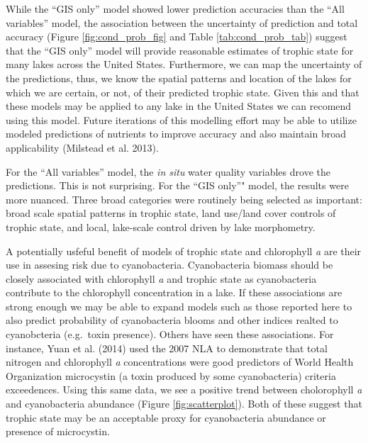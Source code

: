 \documentclass[12pt,]{article}
\begin{document}
While the ``GIS only'' model showed lower prediction accuracies than the
``All variables'' model, the association between the uncertainty of
prediction and total accuracy (Figure \ref{fig:cond_prob_fig} and Table
\ref{tab:cond_prob_tab}) suggest that the ``GIS only'' model will
provide reasonable estimates of trophic state for many lakes across the
United States. Furthermore, we can map the uncertainty of the
predictions, thus, we know the spatial patterns and location of the
lakes for which we are certain, or not, of their predicted trophic
state. Given this and that these models may be applied to any lake in
the United States we can recomend using this model. Future iterations of
this modelling effort may be able to utilize modeled predictions of
nutrients to improve accuracy and also maintain broad applicability
(Milstead et al. 2013).

For the ``All variables'' model, the \emph{in situ} water quality
variables drove the predictions. This is not surprising. For the ``GIS
only''" model, the results were more nuanced. Three broad categories
were routinely being selected as important: broad scale spatial patterns
in trophic state, land use/land cover controls of trophic state, and
local, lake-scale control driven by lake morphometry.

A potentially usfeful benefit of models of trophic state and chlorophyll
\emph{a} are their use in assesing risk due to cyanobacteria.
Cyanobacteria biomass should be closely associated with chlorophyll
\emph{a} and trophic state as cyanobacteria contribute to the
chlorophyll concentration in a lake. If these associations are strong
enough we may be able to expand models such as those reported here to
also predict probability of cyanobacteria blooms and other indices
realted to cyanobcteria (e.g.~toxin presence). Others have seen these
associations. For instance, Yuan et al. (2014) used the 2007 NLA to
demonstrate that total nitrogen and chlorophyll \emph{a} concentrations
were good predictors of World Health Organization microcystin (a toxin
produced by some cyanobacteria) criteria exceedences. Using this same
data, we see a positive trend between cholorophyll \emph{a} and
cyanobacteria abundance (Figure \ref{fig:scatterplot}). Both of these
suggest that trophic state may be an acceptable proxy for cyanobacteria
abundance or presence of microcystin.
\end{document}
